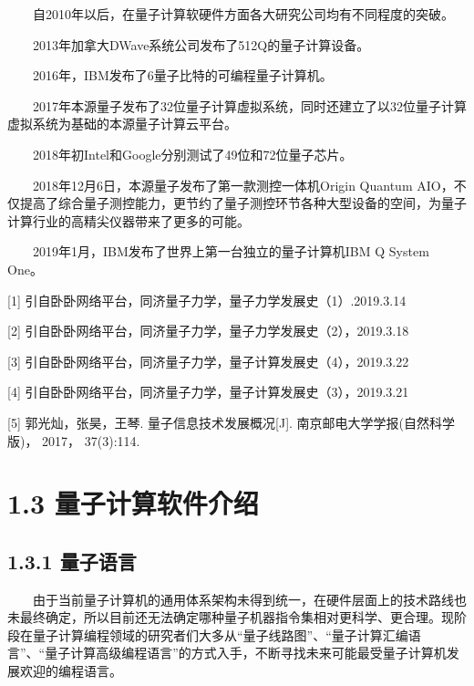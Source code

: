 \documentclass[a4paper,11pt,english]{sphinxmanual}
\begin{document}
\sphinxAtStartPar
  自2010年以后，在量子计算软硬件方面各大研究公司均有不同程度的突破。

\sphinxAtStartPar
  2013年加拿大D\sphinxhyphen{}Wave系统公司发布了512Q的量子计算设备。

\sphinxAtStartPar
  2016年，IBM发布了6量子比特的可编程量子计算机。

\sphinxAtStartPar
  2017年本源量子发布了32位量子计算虚拟系统，同时还建立了以32位量子计算虚拟系统为基础的本源量子计算云平台。

\sphinxAtStartPar
  2018年初Intel和Google分别测试了49位和72位量子芯片。

\sphinxAtStartPar
  2018年12月6日，本源量子发布了第一款测控一体机Origin Quantum AIO，不仅提高了综合量子测控能力，更节约了量子测控环节各种大型设备的空间，为量子计算行业的高精尖仪器带来了更多的可能。

\sphinxAtStartPar
  2019年1月，IBM发布了世界上第一台独立的量子计算机IBM Q System One。

\sphinxAtStartPar
{}

\sphinxAtStartPar
{[}1{]} 引自卧卧网络平台，同济量子力学，量子力学发展史（1）.2019.3.14

\sphinxAtStartPar
{[}2{]} 引自卧卧网络平台，同济量子力学，量子力学发展史（2），2019.3.18

\sphinxAtStartPar
{[}3{]} 引自卧卧网络平台，同济量子力学，量子计算发展史（4），2019.3.22

\sphinxAtStartPar
{[}4{]} 引自卧卧网络平台，同济量子力学，量子计算发展史（3），2019.3.21

\sphinxAtStartPar
{[}5{]} 郭光灿，张昊，王琴. 量子信息技术发展概况{[}J{]}. 南京邮电大学学报(自然科学版)， 2017， 37(3):1\sphinxhyphen{}14.

\sphinxstepscope


\section{1.3 量子计算软件介绍}
\label{\detokenize{rst/1.3_u91cf_u5b50_u8ba1_u7b97_u8f6f_u4ef6_u4ecb_u7ecd:id1}}\label{\detokenize{rst/1.3_u91cf_u5b50_u8ba1_u7b97_u8f6f_u4ef6_u4ecb_u7ecd::doc}}

\subsection{1.3.1 量子语言}
\label{\detokenize{rst/1.3_u91cf_u5b50_u8ba1_u7b97_u8f6f_u4ef6_u4ecb_u7ecd:id2}}
\sphinxAtStartPar
  由于当前量子计算机的通用体系架构未得到统一，在硬件层面上的技术路线也未最终确定，所以目前还无法确定哪种量子机器指令集相对更科学、更合理。现阶段在量子计算编程领域的研究者们大多从“量子线路图”、“量子计算汇编语言”、“量子计算高级编程语言”的方式入手，不断寻找未来可能最受量子计算机发展欢迎的编程语言。
\end{document}
